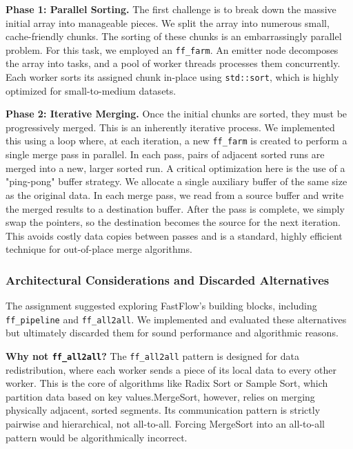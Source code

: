 \documentclass[10pt]{article}
\newcommand{\code}[1]{\texttt{#1}}
\begin{document}
\textbf{Phase 1: Parallel Sorting.} The first challenge is to break down the massive initial array into manageable pieces. We split the array into numerous small, cache-friendly chunks. The sorting of these chunks is an embarrassingly parallel problem. For this task, we employed an \code{ff\_farm}. An emitter node decomposes the array into tasks, and a pool of worker threads processes them concurrently. Each worker sorts its assigned chunk in-place using \code{std::sort}, which is highly optimized for small-to-medium datasets.

\textbf{Phase 2: Iterative Merging.} Once the initial chunks are sorted, they must be progressively merged. This is an inherently iterative process. We implemented this using a loop where, at each iteration, a new \code{ff\_farm} is created to perform a single merge pass in parallel. In each pass, pairs of adjacent sorted runs are merged into a new, larger sorted run. A critical optimization here is the use of a "ping-pong" buffer strategy. We allocate a single auxiliary buffer of the same size as the original data. In each merge pass, we read from a source buffer and write the merged results to a destination buffer. After the pass is complete, we simply swap the pointers, so the destination becomes the source for the next iteration. This avoids costly data copies between passes and is a standard, highly efficient technique for out-of-place merge algorithms.

\subsubsection{Architectural Considerations and Discarded Alternatives}
The assignment suggested exploring FastFlow's building blocks, including \code{ff\_pipeline} and \code{ff\_all2all}. We implemented and evaluated these alternatives but ultimately discarded them for sound performance and algorithmic reasons.

\textbf{Why not \code{ff\_all2all}?} The \code{ff\_all2all} pattern is designed for data redistribution, where each worker sends a piece of its local data to every other worker. This is the core of algorithms like Radix Sort or Sample Sort, which partition data based on key values.MergeSort, however, relies on merging physically adjacent, sorted segments. Its communication pattern is strictly pairwise and hierarchical, not all-to-all. Forcing MergeSort into an all-to-all pattern would be algorithmically incorrect.
\end{document}
